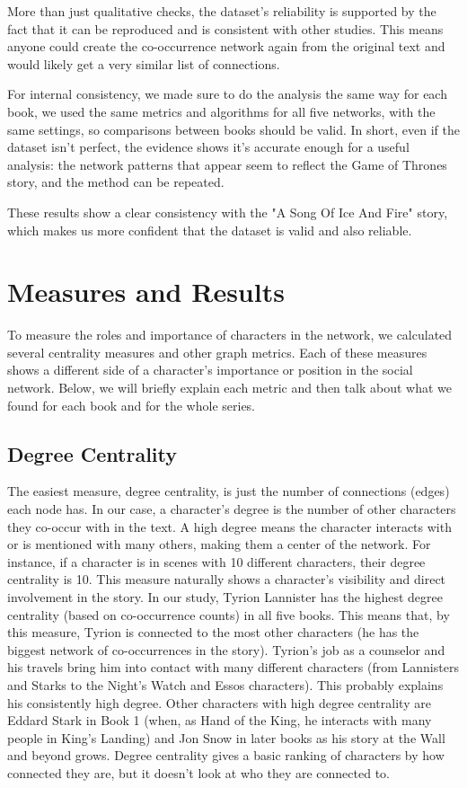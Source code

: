 \documentclass[12pt, a4paper]{article}
\begin{document}
More than just qualitative checks, the dataset's reliability is supported by the fact that it can be reproduced and is consistent with other studies. This means anyone could create the co-occurrence network again from the original text and would 
likely get a very similar list of connections. 


For internal consistency, we made sure to do the analysis the same way for each book, we used the same metrics and algorithms 
 for all five networks, with the same settings, so comparisons between books should be valid. In short, even if the dataset isn't perfect, 
 the evidence shows it's accurate enough for a useful analysis: the network patterns that appear seem to reflect the Game of Thrones story, 
 and the method can be repeated. 
 
 These results show a clear consistency with the "A Song Of Ice And Fire" story, which makes us more confident that the dataset is valid and also reliable.
 
 

\section{Measures and Results}
\label{measures}
To measure the roles and importance of characters in the network, we calculated several centrality measures and other graph metrics. Each of these measures shows a different side of a character's importance or position in the social network. Below, we will briefly explain each metric and then talk about what we found for each book and for the whole series.

\subsection*{Degree Centrality}
The easiest measure, degree centrality, is just the number of connections (edges) each node has. In our case, a character's degree is the number of other characters they co-occur with in the text. A high degree means the character interacts with or is mentioned with many others, making them a center of the network. For instance, if a character is in scenes with 10 different characters, their degree centrality is 10. This measure naturally shows a character's visibility and direct involvement in the story. In our study, Tyrion Lannister has the highest degree centrality (based on co-occurrence counts) in all five books. This means that, by this measure, Tyrion is connected to the most other characters (he has the biggest network of co-occurrences in the story). Tyrion's job as a counselor and his travels bring him into contact with many different characters (from Lannisters and Starks to the Night's Watch and Essos characters). This probably explains his consistently high degree. Other characters with high degree centrality are Eddard Stark in Book 1 (when, as Hand of the King, he interacts with many people in King's Landing) and Jon Snow in later books as his story at the Wall and beyond grows. Degree centrality gives a basic ranking of characters by how connected they are, but it doesn't look at who they are connected to.
\end{document}
